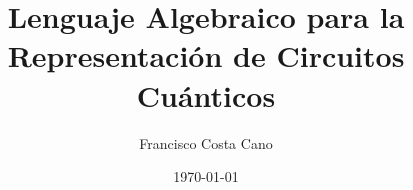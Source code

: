 \documentclass[]{article}
\begin{document}
\title{Lenguaje Algebraico para la Representación de Circuitos Cuánticos}
\date{\today}
\author{Francisco Costa Cano}

%
\maketitle

%










\printbibliography
\end{document}
